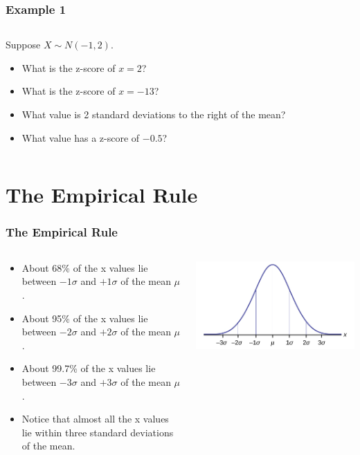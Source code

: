 \documentclass[12pt,twocolumn]{article}
\begin{document}
\begin{frame}[t]
 \frametitle{Example 1}
 \begin{columns}
  \begin{column}{0.5\textwidth}
   Suppose $X \sim N(-1,2)$.
   \begin{itemize}
   \item What is the z-score of $x=2$?
   \item What is the z-score of $x=-13$?
   \item What value is 2 standard deviations to the right of the mean?
   \item What value has a z-score of $-0.5$?
   \end{itemize}
  \end{column}
  \begin{column}{0.5\textwidth}
  \end{column}
 \end{columns}
\end{frame}

\section{The Empirical Rule}

\begin{frame}[t]
 \frametitle{The Empirical Rule}
 \begin{columns}
  \begin{column}{0.5\textwidth}
    \begin{itemize}
     \item About 68\% of the x values lie between $-1\sigma$ and $+1\sigma$ of the mean $\mu$.
     \item About 95\% of the x values lie between $-2\sigma$ and $+2\sigma$ of the mean $\mu$.
     \item About 99.7\% of the x values lie between $-3\sigma$ and $+3\sigma$ of the mean $\mu$.
     \item Notice that almost all the x values lie within three standard deviations of the mean.
    \end{itemize}
  \end{column}
  \begin{column}{0.5\textwidth}
    \includegraphics[width=\linewidth]{normal_distribution.jpg}
  \end{column}
 \end{columns}
\end{frame}
\end{document}
